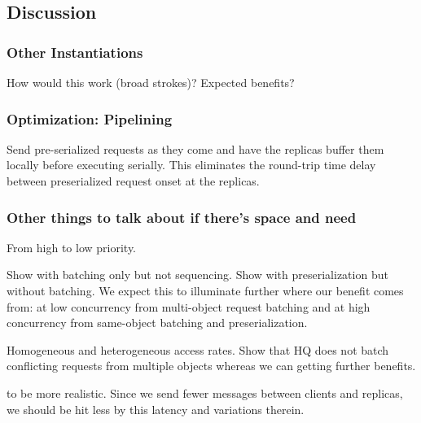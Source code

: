 \documentclass[twocolumn,10pt]{article}
\newcommand{\stitle}[1]{\vspace{2pt}{\bf #1:}}
\begin{document}
\subsection{Discussion}
\label{sec:ps-other}



\subsubsection{Other Instantiations}

\stitle{PS-Q/U} How would this work (broad strokes)?  Expected benefits?


\subsubsection{Optimization: Pipelining}

Send pre-serialized requests as they come and have the replicas buffer
them locally before executing serially. This eliminates the round-trip
time delay between preserialized request onset at the replicas.


\subsubsection{Other things to talk about if there's space and need}

From high to low priority.

\stitle{Batching vs. Preserialization} Show with batching only but not
sequencing.  Show with preserialization but without batching.  We expect
this to illuminate further where our benefit comes from: at low
concurrency from multi-object request batching and at high concurrency
from same-object batching and preserialization.

\stitle{Multiple shared objects} Homogeneous and heterogeneous access
rates.  Show that HQ does not batch conflicting requests from multiple
objects whereas we can getting further benefits.

\stitle{Different latency between clients and replicas} to be more
realistic.  Since we send fewer messages between clients and replicas,
we should be hit less by this latency and variations therein.

\end{document}
